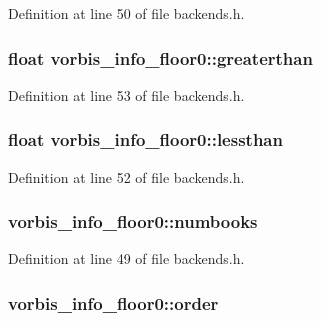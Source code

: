 Definition at line 50 of file backends.\+h.

\subsubsection[{\texorpdfstring{greaterthan}{greaterthan}}]{\setlength{\rightskip}{0pt plus 5cm}float vorbis\+\_\+info\+\_\+floor0\+::greaterthan}\hypertarget{structvorbis__info__floor0_a0c56a9e6c934a2d03c4755ca7f3e5de4}{}\label{structvorbis__info__floor0_a0c56a9e6c934a2d03c4755ca7f3e5de4}


Definition at line 53 of file backends.\+h.

\subsubsection[{\texorpdfstring{lessthan}{lessthan}}]{\setlength{\rightskip}{0pt plus 5cm}float vorbis\+\_\+info\+\_\+floor0\+::lessthan}\hypertarget{structvorbis__info__floor0_ad2bb0e03d446f4058d5c73a317216876}{}\label{structvorbis__info__floor0_ad2bb0e03d446f4058d5c73a317216876}


Definition at line 52 of file backends.\+h.

\subsubsection[{\texorpdfstring{numbooks}{numbooks}}]{ vorbis\+\_\+info\+\_\+floor0\+::numbooks}\hypertarget{structvorbis__info__floor0_ae0b77b1ba0cc2cb5f3b5731758817540}{}\label{structvorbis__info__floor0_ae0b77b1ba0cc2cb5f3b5731758817540}


Definition at line 49 of file backends.\+h.

\subsubsection[{\texorpdfstring{order}{order}}]{ vorbis\+\_\+info\+\_\+floor0\+::order}\hypertarget{structvorbis__info__floor0_a84d5b9c9a1c85caeb2cdd57992d8489d}{}\label{structvorbis__info__floor0_a84d5b9c9a1c85caeb2cdd57992d8489d}


